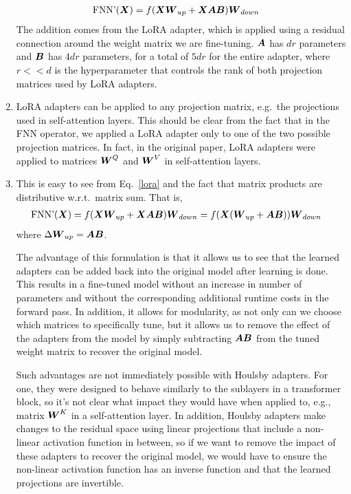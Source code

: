 \documentclass[11pt,a4paper]{article}
\newcommand\op[1]{\operatorname{#1}}
\begin{document}
\begin{enumerate}[label=(\alph*)]
\begin{align}
              \op{FNN'}(\mX) & = f(\mX\mW_{up} + \mX\mA\mB)\mW_{down}
          \end{align}
          The addition comes from the LoRA adapter, which is applied using a
          residual connection around the weight matrix we are fine-tuning.
          ${\boldsymbol{A}}$ has $dr$ parameters and ${\boldsymbol{B}}$ has $4dr$ parameters, for a total
          of $5dr$ for the entire adapter, where $r << d$ is the hyperparameter 
          that controls the rank of both projection matrices used by LoRA 
          adapters.
    \item LoRA adapters can be applied to any projection matrix, e.g.\ the
          projections used in self-attention layers. This should be clear from
          the fact that in the FNN operator, we applied a LoRA adapter only to
          one of the two possible projection matrices.
          In fact, in the original paper, LoRA adapters were applied to matrices
          ${\boldsymbol{W}}^Q$ and ${\boldsymbol{W}}^V$ in self-attention layers.
    \item This is easy to see from Eq.~\ref{lora} and the fact
          that matrix products are distributive w.r.t.\ matrix sum.
          That is,
          \begin{align}
              \op{FNN'}(\mX) & = f(\mX\mW_{up} + \mX\mA\mB)\mW_{down} = f(\mX(\mW_{up} + \mA\mB))\mW_{down}
          \end{align}
          where $\Delta{\boldsymbol{W}}_{up} = {\boldsymbol{A}}{\boldsymbol{B}}$.

          The advantage of this formulation is that it allows us to see that
          the learned adapters can be added back into the original model after
          learning is done. This results in a fine-tuned model without an
          increase in number of parameters and without the corresponding
          additional runtime costs in the forward pass.
          In addition, it allows for modularity, as not only can we choose which
          matrices to specifically tune, but it allows us to remove the effect
          of the adapters from the model by simply subtracting ${\boldsymbol{A}}{\boldsymbol{B}}$ from the
          tuned weight matrix to recover the original model.

          Such advantages are not immediately possible with Houlsby adapters.
          For one, they were designed to behave similarly to the sublayers in a
          transformer block, so it's not clear what impact they would have when
          applied to, e.g., matrix ${\boldsymbol{W}}^K$ in a self-attention layer.
          In addition, Houlsby adapters make changes to the residual space using
          linear projections that include a non-linear activation function in
          between, so if we want to remove the impact of these adapters to
          recover the original model, we would have to ensure the non-linear
          activation function has an inverse function and that the learned
          projections are invertible.

\end{enumerate}
\end{document}
